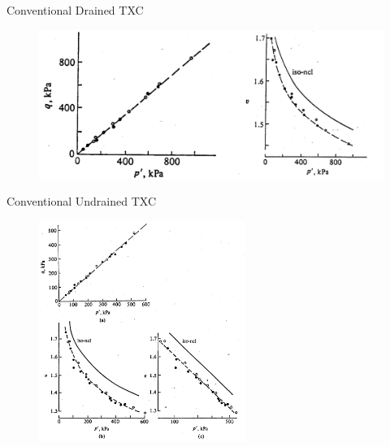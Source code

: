 \documentclass[notes]{beamer}
\begin{document}
\begin{frame}{Conventional Drained TXC}
	\begin{figure}
		\includegraphics[width=\textwidth]{figs/p-q-v-drained_weald-clay.png}
	\end{figure}
\end{frame}

\begin{frame}{Conventional Undrained TXC}
	\begin{figure}
		\includegraphics[width=0.6\textwidth]{figs/p-q-v-undrained-weald.png}
	\end{figure}
\end{frame}
\end{document}

